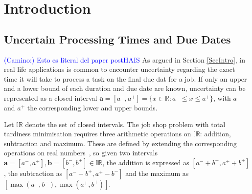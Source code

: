 \documentclass[preprint]{elsarticle}
\newcommand{\textcam}[1]{\textcolor{blue}{(Camino:) #1}}
\begin{document}
%
\section{Introduction}\label{secIntro}


\subsection{Uncertain Processing Times and Due Dates} \label{subsecIntervalDurations}
\textcam{Esto es literal del paper postHAIS}
As argued in Section \ref{SecIntro}, in real life applications is common to encounter uncertainty regarding the exact time it will take to process a task on the final due dat for a job.  If only an upper and a lower bound of each duration and due date are known, uncertainty can be represented as a closed interval  $\mathbf{a}=[a^-,a^+]=\{x \in \mathbb{R}: a^- \leq x \leq a^+\}$, with $a^-$ and $a^+$ the corresponding lower and upper bounds.

Let $\mathbb{IR}$ denote the set of closed intervals. The job shop problem with total tardiness minimisation requires three arithmetic operations on $\mathbb{IR}$: addition, subtraction and maximum. These are defined by extending the corresponding operations on real numbers~\cite{Moore2009}, so given two intervals $\mathbf{a}=[a^-,a^+], \mathbf{b}=[b^-,b^+] \in \mathbb{IR}$, the addition is expressed as $[a^-+b^-, a^++b^+]$, the subtraction as $[a^- - b^+, a^+ - b^-]$ and the maximum as $[\max(a^-, b^-), \max(a^+, b^+)]$.

\end{document}

